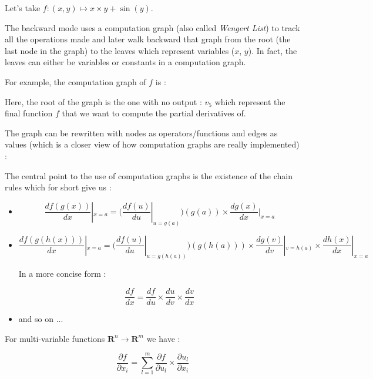 \documentclass[12pt]{article}
\begin{document}
Let's take $f: (x,y) \mapsto x \times y + \sin(y) $.

\bigskip

The backward mode uses a computation graph (also called {\it Wengert List}) to track all the operations made and later walk backward that graph from the root (the last node in the graph) to the leaves which represent variables ($x$, $y$). In fact, the leaves can either be variables or constants in a computation graph.

For example, the computation graph of $f$ is :

\begin{figure}[H]
 \centering
 
\end{figure}

Here, the root of the graph is the one with no output : $v_5$ which represent the final function $f$ that we want to compute the partial derivatives of.

\bigskip 

The graph can be rewritten with nodes as operators/functions and edges as values (which is a closer view of how computation graphs are really implemented) : 

\begin{figure}[H]
 \centering
 
\end{figure}


The central point to the use of computation graphs is the existence of the chain rules \cite{wiki_chain_rules} which for short give us :

\begin{itemize}
    \item 
$$
\frac{df(g(x))}{dx}|_{x=a}= \big( \frac{df(u)}{du}|_{u=g(a)} \big)(g(a)) \times \frac{dg(x)}{dx}|_{x=a}
$$
    \item 
$$
\frac{df(g(h(x)))}{dx}|_{x=a}= \big( \frac{df(u)}{du}|_{u=g(h(a))} \big)(g(h(a))) \times \frac{dg(v)}{dv}|_{v=h(a)} \times \frac{dh(x)}{dx}|_{x=a}
$$

In a more concise form : 

$$
\frac{df}{dx} = \frac{df}{du} \times \frac{du}{dv} \times \frac{dv}{dx}
$$

    \item and so on ...
\end{itemize}

For multi-variable functions $\mathbf{R}^n \rightarrow \mathbf{R}^m$ we have :

$$
\frac{\partial{f}}{\partial{x_i}} = \sum_{l=1}^{m} \frac{\partial{f}}{\partial{u_l}} \times  \frac{\partial{u_l}}{\partial{x_i}}
$$
\end{document}
